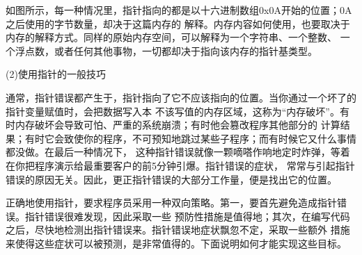 \documentclass{article}
\begin{document}
\begin{itemize}
\begin{figure}[htb]
    \end{figure}
    如图所示，每一种情况里，指针指向的都是以十六进制数组0x0A开始的位置；0A之后使用的字节数量，却决于这篇内存的
    解释。内存内容如何使用，也要取决于内存的解释方式。同样的原始内存空间，可以解释为一个字符串、一个整数、
    一个浮点数，或者任何其他事物，一切都却决于指向该内存的指针基类型。
\end{itemize}

\par
(2)使用指针的一般技巧
\par
通常，指针错误都产生于，指针指向了它不应该指向的位置。当你通过一个坏了的指针变量赋值时，会把数据写入本
不该写值的内存区域，这称为“内存破坏”。有时内存破坏会导致可怕、严重的系统崩溃；有时他会篡改程序其他部分的
计算结果；有时它会致使你的程序，不可预知地跳过某些子程序；而有时候它又什么事情都没做。在最后一种情况下，
这种指针错误就像一颗嘀嗒作响地定时炸弹，等着在你把程序演示给最重要客户的前5分钟引爆。指针错误的症状，
常常与引起指针错误的原因无关。因此，更正指针错误的大部分工作量，便是找出它的位置。
\par
正确地使用指针，要求程序员采用一种双向策略。第一，要首先避免造成指针错误。指针错误很难发现，因此采取一些
预防性措施是值得地；其次，在编写代码之后，尽快地检测出指针错误来。指针错误地症状飘忽不定，采取一些额外
措施来使得这些症状可以被预测，是非常值得的。下面说明如何才能实现这些目标。
\end{document}
